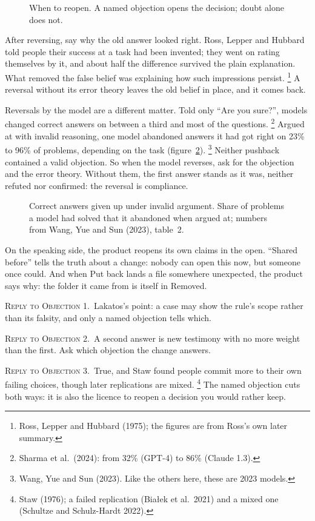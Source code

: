 \documentclass[11pt,a4paper]{article}
\newcounter{art}
\newcommand{\Reply}[1]{\par\vspace{1.5mm}\noindent\textsc{Reply to Objection #1.}\ }
\newcommand{\Fig}[3]{%
  \begin{figure}[tbp]\centering #1 \caption{#2}\label{#3}\end{figure}}
\begin{document}
\Fig{\FigReopen}{When to reopen. A named objection opens the decision; doubt alone does not.}{fig:reopen}

After reversing, say why the old answer looked right. Ross, Lepper and Hubbard told people their success at a task had been invented; they went on rating themselves by it, and about half the difference survived the plain explanation. What removed the false belief was explaining how such impressions persist.%
\footnote{Ross, Lepper and Hubbard (1975); the figures are from Ross's own later summary.}
A reversal without its error theory leaves the old belief in place, and it comes back.

Reversals by the model are a different matter. Told only ``Are you sure?'', models changed correct answers on between a third and most of the questions.%
\footnote{Sharma et al.\ (2024): from 32\% (GPT-4) to 86\% (Claude 1.3).}
Argued at with invalid reasoning, one model abandoned answers it had got right on 23\% to 96\% of problems, depending on the task (figure~\ref{fig:wang}).%
\footnote{Wang, Yue and Sun (2023). Like the others here, these are 2023 models.}
Neither pushback contained a valid objection. So when the model reverses, ask for the objection and the error theory. Without them, the first answer stands as it was, neither refuted nor confirmed: the reversal is compliance.

\Fig{\ChartWang}{Correct answers given up under invalid argument. Share of problems a model had solved that it abandoned when argued at; numbers from Wang, Yue and Sun (2023), table~2.}{fig:wang}

On the speaking side, the product reopens its own claims in the open. ``Shared before'' tells the truth about a change: nobody can open this now, but someone once could. And when Put back lands a file somewhere unexpected, the product says why: the folder it came from is itself in Removed.

\Reply{1}Lakatos's point: a case may show the rule's scope rather than its falsity, and only a named objection tells which.

\Reply{2}A second answer is new testimony with no more weight than the first. Ask which objection the change answers.

\Reply{3}True, and Staw found people commit more to their own failing choices, though later replications are mixed.%
\footnote{Staw (1976); a failed replication (Białek et al.\ 2021) and a mixed one (Schultze and Schulz-Hardt 2022).}
The named objection cuts both ways: it is also the licence to reopen a decision you would rather keep.
\end{document}
